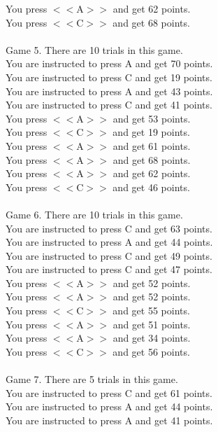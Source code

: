 \documentclass[pdflatex,sn-nature]{sn-jnl}%
\theoremstyle{thmstyleone}%
\theoremstyle{thmstyletwo}%
\theoremstyle{thmstylethree}%
\begin{document}
You press $<<$A$>>$ and get 62 points. $~$\\ 
You press $<<$C$>>$ and get 68 points. $~$\\ 
 $~$\\ 
Game 5. There are 10 trials in this game. $~$\\ 
You are instructed to press A and get 70 points. $~$\\ 
You are instructed to press C and get 19 points. $~$\\ 
You are instructed to press A and get 43 points. $~$\\ 
You are instructed to press C and get 41 points. $~$\\ 
You press $<<$A$>>$ and get 53 points. $~$\\ 
You press $<<$C$>>$ and get 19 points. $~$\\ 
You press $<<$A$>>$ and get 61 points. $~$\\ 
You press $<<$A$>>$ and get 68 points. $~$\\ 
You press $<<$A$>>$ and get 62 points. $~$\\ 
You press $<<$C$>>$ and get 46 points. $~$\\ 
 $~$\\ 
Game 6. There are 10 trials in this game. $~$\\ 
You are instructed to press C and get 63 points. $~$\\ 
You are instructed to press A and get 44 points. $~$\\ 
You are instructed to press C and get 49 points. $~$\\ 
You are instructed to press C and get 47 points. $~$\\ 
You press $<<$A$>>$ and get 52 points. $~$\\ 
You press $<<$A$>>$ and get 52 points. $~$\\ 
You press $<<$C$>>$ and get 55 points. $~$\\ 
You press $<<$A$>>$ and get 51 points. $~$\\ 
You press $<<$A$>>$ and get 34 points. $~$\\ 
You press $<<$C$>>$ and get 56 points. $~$\\ 
 $~$\\ 
Game 7. There are 5 trials in this game. $~$\\ 
You are instructed to press C and get 61 points. $~$\\ 
You are instructed to press A and get 44 points. $~$\\ 
You are instructed to press A and get 41 points. $~$\\ 
\end{document}
